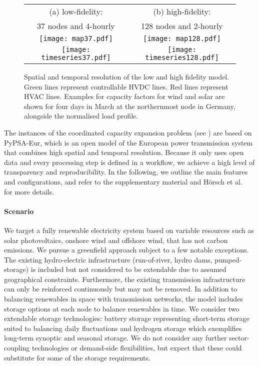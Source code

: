 \begin{figure}
    \centering
        \begin{tabular}{cc}
            \footnotesize (a) low-fidelity: & \footnotesize (b) high-fidelity:
            \\
            \footnotesize 37 nodes and 4-hourly & \footnotesize 128 nodes and
            2-hourly \\
            \texttt{[image: map37.pdf]} &
            \texttt{[image: map128.pdf]} \\
            \texttt{[image: timeseries37.pdf]} &
            \texttt{[image: timeseries128.pdf]} \\
        \end{tabular}
    \caption[Spatial and temporal resolution of the low and high fidelity
    model]{Spatial and temporal resolution of the low and high fidelity model.
    Green lines represent controllable HVDC lines. Red lines represent HVAC
    lines. Examples for capacity factors for wind and solar are shown for four
    days in March at the northernmost node in Germany, alongside the normalised
    load profile.}
    \label{fig:pypsaeur}
\end{figure}


The instances of the coordinated capacity expansion problem (see
 ) are based on \mbox{PyPSA-Eur}, which is an open model
 of the European power transmission system that combines high spatial and
 temporal resolution.\cite{pypsaeur} Because it only uses open data and every
 processing step is defined in a workflow,\cite{snakemake} we achieve a high
 level of transparency and reproducibility. In the following, we outline the
 main features and configurations, and refer to the supplementary material and
 Hörsch et al.~\cite{pypsaeur} for more details.

\paragraph{Scenario}
We target a fully renewable electricity system based on variable resources such
as solar photovoltaics, onshore wind and offshore wind, that has not carbon
emissions. We pursue a greenfield approach subject to a few notable exceptions.
The existing hydro-electric infrastructure (run-of-river, hydro dams,
pumped-storage) is included but not considered to be extendable due to assumed
geographical constraints. Furthermore, the existing transmission infrastructure
can only be reinforced continuously but may not be removed. In addition to
balancing renewables in space with transmission networks, the model includes
storage options at each node to balance renewables in time. We consider two
extendable storage technologies: battery storage representing short-term storage
suited to balancing daily fluctuations and hydrogen storage which exemplifies
long-term synoptic and seasonal storage. We do not consider any further
sector-coupling technologies or demand-side flexibilities, but expect that these
could substitute for some of the storage requirements.

